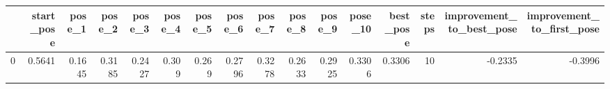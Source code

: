 \begin{tabular}{lrrrrrrrrrrrrrrr}
\toprule
{} &  start\_pose &  pose\_1 &  pose\_2 &  pose\_3 &  pose\_4 &  pose\_5 &  pose\_6 &  pose\_7 &  pose\_8 &  pose\_9 &  pose\_10 &  best\_pose &  steps &  improvement\_to\_best\_pose &  improvement\_to\_first\_pose \\
\midrule
0 &      0.5641 &  0.1645 &  0.3185 &  0.2427 &   0.309 &   0.269 &  0.2796 &  0.3278 &  0.2633 &  0.2925 &   0.3306 &     0.3306 &     10 &                   -0.2335 &                    -0.3996 \\
\bottomrule
\end{tabular}
